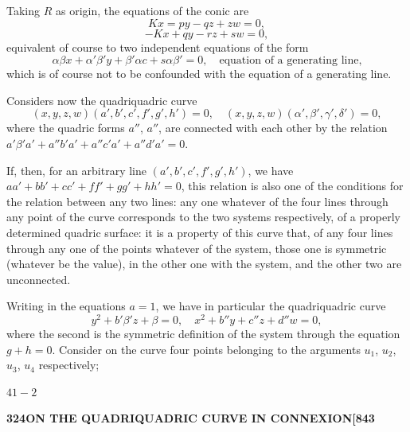 \documentclass[11pt,a4paper]{book}
\begin{document}
Taking $R$ as origin, the equations of the conic are
\[
Kx = py - qz + zw = 0,
\]
\[
-Kx + qy - rz + sw = 0,
\]
equivalent of course to two independent equations of the form
\[
\alpha\beta x + \alpha'\beta'y + \beta'\alpha c + s\alpha\beta' = 0, \quad \text{equation of a generating line,}
\]
which is of course not to be confounded with the equation of a generating line.

Considers now the quadriquadric curve
\[
(x, y, z, w)(a', b', c', f', g', h') = 0, \quad (x, y, z, w)(\alpha', \beta', \gamma', \delta') = 0,
\]
where the quadric forms $a''$, $a''$, are connected with each other by the relation $a'\beta'a' + a''b'a' + a''c'a' + a''d'a' = 0$.

If, then, for an arbitrary line $(a', b', c', f', g', h')$, we have $aa' + bb' + cc' + ff' + gg' + hh' = 0$, this relation is also one of the conditions for the relation between any two lines: any one whatever of the four lines through any point of the curve corresponds to the two systems respectively, of a properly determined quadric surface: it is a property of this curve that, of any four lines through any one of the points whatever of the system, those one is symmetric (whatever be the value), in the other one with the system, and the other two are unconnected.

Writing in the equations $a = 1$, we have in particular the quadriquadric curve
\[
y^2 + b'\beta'z + \beta = 0, \quad x^2 + b''y + c''z + d''w = 0,
\]
where the second is the symmetric definition of the system through the equation $g + h = 0$. Consider on the curve four points belonging to the arguments $u_1$, $u_2$, $u_3$, $u_4$ respectively;

\hfill $41-2$

\newpage
\setcounter{page}{324}

\noindent\textbf{324}\hfill\textbf{ON THE QUADRIQUADRIC CURVE IN CONNEXION}\hfill\textbf{[843}

\bigskip
\end{document}
